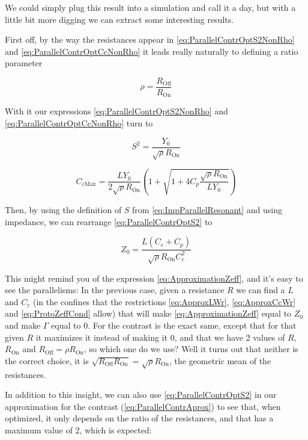 \documentclass[../main.tex]{subfiles}
\begin{document}
We could simply plug this result into a simulation and call it a day, but with
a little bit more digging we can extract some interesting results.

First off, by the way the resistances appear in \ref{eq:ParallelContrOptS2NonRho}
and \ref{eq:ParallelContrOptCcNonRho} it leads really naturally to defining
a ratio parameter

\begin{equation}
\label{eq:RhoDef}
    \rho = \frac{R_{\text{Off}}}{R_{\text{On}}}
\end{equation}

With it our expressions \ref{eq:ParallelContrOptS2NonRho} and
\ref{eq:ParallelContrOptCcNonRho} turn to

\begin{equation}
\label{eq:ParallelContrOptS2}
    S^2 = \frac{Y_{0}}{\sqrt{\rho}R_{\text{On}}}
\end{equation}

\begin{equation}
\label{eq:ParallelContrOptCc}
C_{c\text{Max}} = \frac{L Y_{0}}{2\sqrt{\rho}R_{\text{On}}}
\left(1 + \sqrt{1 + 4C_{p}\frac{\sqrt{\rho}R_{\text{On}}}{LY_{0}}}\right)
\end{equation}

Then, by using the definition of \(S\) from \ref{eq:ImpParallelResonant} and
using impedance, we can rearrange \ref{eq:ParallelContrOptS2} to

\begin{equation}
\label{eq:ParallelTunning}
Z_{0} = \frac{L(C_{c}+C_{p})}{\sqrt{\rho}R_{\text{On}}C_{c}^2}
\end{equation}

This might remind you of the expression \ref{eq:ApproximationZeff}, and it's
easy to see the parallelisms: In the previous case, given a resistance \(R\) we
can find a \(L\) and \(C_{c}\) (in the confines that the restrictions
\ref{eq:ApproxLWr}, \ref{eq:ApproxCcWr} and \ref{eq:ProtoZeffCond} allow)
that will make \ref{eq:ApproximationZeff} equal to \(Z_{0}\) and make \(\Gamma\)
equal to \(0\). For the contrast is the exact same, except that for that given
\(R\) it maximizes it instead of making it \(0\), and that we have 2 values
of \(R\), \(R_{\text{On}}\) and \(R_{\text{Off}} = \rho R_{\text{On}}\), so
which one do we use? Well it turns out that neither is the correct choice,
it is \(\sqrt{R_{\text{Off}}R_{\text{On}}} = \sqrt{\rho}R_{\text{On}}\),
the geometric mean of the resistances.

In addition to this insight, we can also use \ref{eq:ParallelContrOptS2} in
our approximation for the contrast (\ref{eq:ParallelContrAprox}) to see
that, when optimized, it only depends on the ratio of the resistances, and
that has a maximum value of 2, which is expected:
\end{document}
